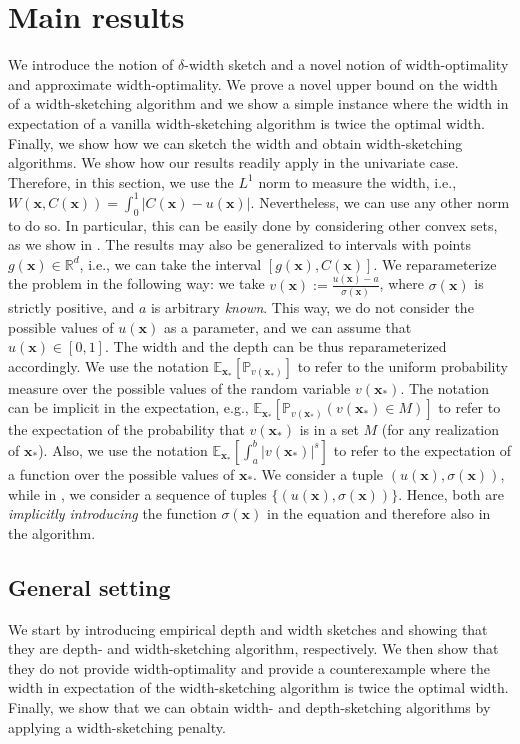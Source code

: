 \documentclass{article} %
\theoremstyle{remark}
\theoremstyle{definition}      %
\begin{document}
\section{Main results}
We introduce the notion of $\delta$-width sketch and a novel notion of width-optimality and approximate width-optimality. We prove a novel upper bound on the width of a width-sketching algorithm and we show a simple instance where the width in expectation of a vanilla width-sketching algorithm is twice the optimal width. Finally, we show how we can sketch the width and obtain width-sketching algorithms. We show how our results readily apply in the univariate case. Therefore, in this section, we use the $L^1$ norm to measure the width, i.e., $W(\bm{x},C(\bm{x})) = \int_0^1 |C(\bm{x}) - u(\bm{x})|$. Nevertheless, we can use any other norm to do so. In particular, this can be easily done by considering other convex sets, as we show in . The results may also be generalized to intervals with points $g(\bm{x}) \in \mathbb{R}^d$, i.e., we can take the interval $[g(\bm{x}),C(\bm{x})]$. We reparameterize the problem in the following way: we take $v(\bm{x}) := \frac{u(\bm{x}) - a}{\sigma(\bm{x})}$, where $\sigma(\bm{x})$ is strictly positive, and $a$ is arbitrary \emph{known}. This way, we do not consider the possible values of $u(\bm{x})$ as a parameter, and we can assume that $u(\bm{x}) \in [0,1]$. The width and the depth can be thus reparameterized accordingly. We use the notation $\mathbb{E}_{\bm{x}_*}[\mathbb{P}_{v(\bm{x_*})}]$ to refer to the uniform probability measure over the possible values of the random variable $v(\bm{x_*})$. The notation can be implicit in the expectation, e.g., $\mathbb{E}_{\bm{x}_*}[\mathbb{P}_{v(\bm{x_*})}(v(\bm{x_*}) \in M)]$ to refer to the expectation of the probability that $v(\bm{x_*})$ is in a set $M$ (for any realization of $\bm{x_*}$). 
Also, we use the notation $\mathbb{E}_{\bm{x}_*}[\int_{a}^{b} |v(\bm{x_*})|^{s}]$ to refer to the expectation of a function over the possible values of $\bm{x_*}$. 
We consider a tuple $(u(\bm{x}), \sigma(\bm{x}))$, while in , we consider a sequence of tuples $\{(u(\bm{x}), \sigma(\bm{x}))\}$. Hence, both  are \emph{implicitly introducing} the function $\sigma(\bm{x})$ in the equation and therefore also in the algorithm.

\subsection{General setting} 
We start by introducing empirical depth and width sketches and showing that they are depth- and width-sketching algorithm, respectively. We then show that they do not provide width-optimality and provide a counterexample where the width in expectation of the width-sketching algorithm is twice the optimal width. Finally, we show that we can obtain width- and depth-sketching algorithms by applying a width-sketching penalty.
\end{document}
